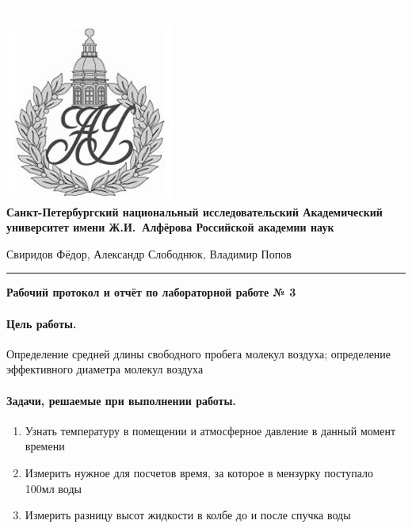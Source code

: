 \documentclass{article}
\begin{document}
\begin{center}
	\includegraphics[scale=0.25]{AU}\\
	{\Large\bfseries Санкт-Петербургский национальный исследовательский Академический университет имени Ж.И.~Алфёрова Российской академии наук}
\end{center}

\begin{center}
	Свиридов Фёдор, Александр Слободнюк, Владимир Попов
\end{center}
\rule{12cm}{0.4mm}
\begin{center}
	{\large\textbf{Рабочий протокол и отчёт по лабораторной работе № 3}}
\end{center}

\paragraph{Цель работы.}
Определение средней длины свободного пробега молекул воздуха; определение эффективного диаметра молекул воздуха

\paragraph{Задачи, решаемые при выполнении работы.}
\begin{enumerate}
	\item Узнать температуру в помещении и атмосферное давление в данный момент времени
	\item Измерить нужное для посчетов время, за которое в мензурку поступало 100мл воды
	\item Измерить разницу высот жидкости в колбе до и после спучка воды
\end{enumerate}
\end{document}
